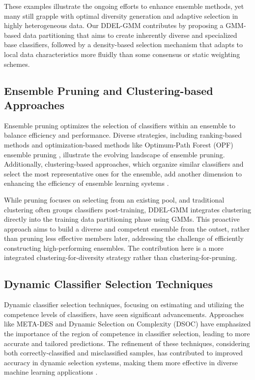 \documentclass[lettersize,journal]{IEEEtran}
\newcommand{\greenhighlight}[1]{#1} %
\begin{document}
\greenhighlight{These examples illustrate the ongoing efforts to enhance ensemble methods, yet many still grapple with optimal diversity generation and adaptive selection in highly heterogeneous data. Our DDEL-GMM contributes by proposing a GMM-based data partitioning that aims to create inherently diverse and specialized base classifiers, followed by a density-based selection mechanism that adapts to local data characteristics more fluidly than some consensus or static weighting schemes.}

\subsection{Ensemble Pruning and Clustering-based Approaches}
\noindent Ensemble pruning optimizes the selection of classifiers within an ensemble to balance efficiency and performance. Diverse strategies, including ranking-based methods and optimization-based methods like Optimum-Path Forest (OPF) ensemble pruning \cite{fernandes_pruning_2017}, illustrate the evolving landscape of ensemble pruning. Additionally, clustering-based approaches, which organize similar classifiers and select the most representative ones for the ensemble, add another dimension to enhancing the efficiency of ensemble learning systems \cite{cruz_dynamic_2018}.

\greenhighlight{While pruning focuses on selecting from an existing pool, and traditional clustering often groups classifiers post-training, DDEL-GMM integrates clustering directly into the training data partitioning phase using GMMs. This proactive approach aims to build a diverse and competent ensemble from the outset, rather than pruning less effective members later, addressing the challenge of efficiently constructing high-performing ensembles. The contribution here is a more integrated clustering-for-diversity strategy rather than clustering-for-pruning.}

\subsection{Dynamic Classifier Selection Techniques}
\noindent Dynamic classifier selection techniques, focusing on estimating and utilizing the competence levels of classifiers, have seen significant advancements. Approaches like META-DES and Dynamic Selection on Complexity (DSOC) have emphasized the importance of the region of competence in classifier selection, leading to more accurate and tailored predictions. The refinement of these techniques, considering both correctly-classified and misclassified samples, has contributed to improved accuracy in dynamic selection systems, making them more effective in diverse machine learning applications \cite{cruz_dynamic_2018}.
\end{document}
